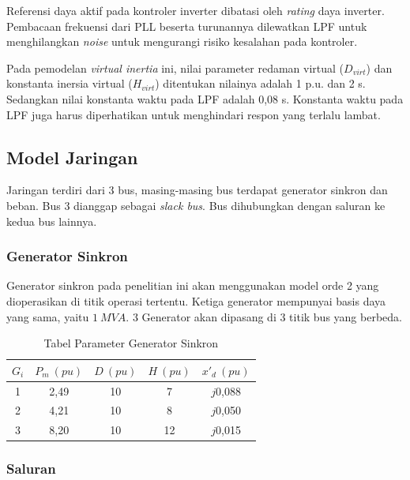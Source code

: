 Referensi daya aktif pada kontroler inverter dibatasi oleh \textit{rating} daya inverter. Pembacaan frekuensi dari PLL beserta turunannya dilewatkan LPF untuk menghilangkan \textit{noise} untuk mengurangi risiko kesalahan pada kontroler.

Pada pemodelan \textit{virtual inertia} ini, nilai parameter redaman virtual ($\mathit{D_{virt}}$) dan konstanta inersia virtual ($\mathit{H_{virt}}$) ditentukan nilainya adalah 1 p.u. dan 2 s. Sedangkan nilai konstanta waktu pada LPF adalah 0,08 s. Konstanta waktu pada LPF juga harus diperhatikan untuk menghindari respon yang terlalu lambat.



\subsection{Model Jaringan}

Jaringan terdiri dari 3 bus, masing-masing bus terdapat generator sinkron dan beban. Bus 3 dianggap sebagai \textit{slack bus}. Bus dihubungkan dengan saluran ke kedua bus lainnya.


\subsubsection{Generator Sinkron}

Generator sinkron pada penelitian ini akan menggunakan model orde 2 yang dioperasikan di titik operasi tertentu. Ketiga generator mempunyai basis daya yang sama, yaitu $\mathit{1 \ MVA}$. 3 Generator akan dipasang di 3 titik bus yang berbeda.

\begin{table}[ht]
	\caption{Tabel Parameter Generator Sinkron}
	\vspace{0.5em}
	\centering
	\begin{tabular}{|c|c|c|c|c|}
		\hline
		$\mathit{G_i}$ & $\mathit{P_m \ (pu)}$ & $\mathit{D \ (pu)}$ & $\mathit{H \ (pu)}$ & $\mathit{x'_d \ (pu)}$ \\ 
		\hline
		1 & 2,49 & 10 & 7 & $\mathit{j}$0,088 \\
		2 & 4,21 & 10 & 8 & $\mathit{j}$0,050 \\
		3 & 8,20 & 10 & 12 & $\mathit{j}$0,015 \\
		\hline
	\end{tabular}
	\label{Tab: tabel gen}
\end{table}


\subsubsection{Saluran}


